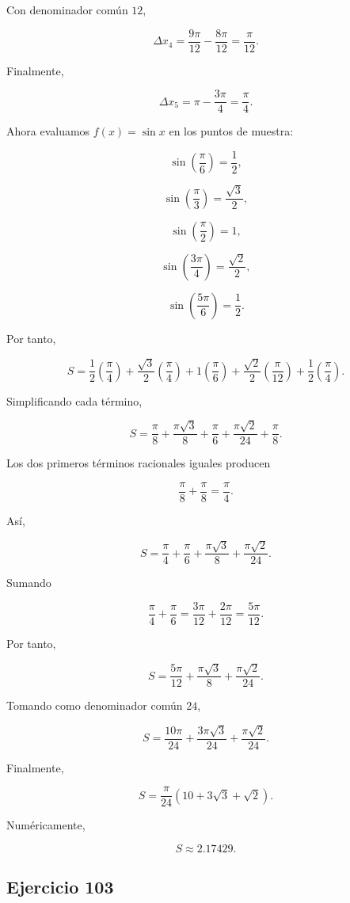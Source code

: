 \documentclass[12pt]{article}
\begin{document}
Con denominador común \(12\),

\[
\Delta x_4
=
\frac{9\pi}{12}-\frac{8\pi}{12}
=
\frac{\pi}{12}.
\]

Finalmente,

\[
\Delta x_5
=
\pi-\frac{3\pi}{4}
=
\frac{\pi}{4}.
\]

Ahora evaluamos \(f(x)=\sin x\) en los puntos de muestra:

\[
\sin\left(\frac{\pi}{6}\right)=\frac12,
\]

\[
\sin\left(\frac{\pi}{3}\right)=\frac{\sqrt3}{2},
\]

\[
\sin\left(\frac{\pi}{2}\right)=1,
\]

\[
\sin\left(\frac{3\pi}{4}\right)=\frac{\sqrt2}{2},
\]

\[
\sin\left(\frac{5\pi}{6}\right)=\frac12.
\]

Por tanto,

\[
S
=
\frac12\left(\frac{\pi}{4}\right)
+
\frac{\sqrt3}{2}
\left(\frac{\pi}{4}\right)
+
1\left(\frac{\pi}{6}\right)
+
\frac{\sqrt2}{2}
\left(\frac{\pi}{12}\right)
+
\frac12\left(\frac{\pi}{4}\right).
\]

Simplificando cada término,

\[
S
=
\frac{\pi}{8}
+
\frac{\pi\sqrt3}{8}
+
\frac{\pi}{6}
+
\frac{\pi\sqrt2}{24}
+
\frac{\pi}{8}.
\]

Los dos primeros términos racionales iguales producen

\[
\frac{\pi}{8}+\frac{\pi}{8}
=
\frac{\pi}{4}.
\]

Así,

\[
S
=
\frac{\pi}{4}
+
\frac{\pi}{6}
+
\frac{\pi\sqrt3}{8}
+
\frac{\pi\sqrt2}{24}.
\]

Sumando

\[
\frac{\pi}{4}+\frac{\pi}{6}
=
\frac{3\pi}{12}+\frac{2\pi}{12}
=
\frac{5\pi}{12}.
\]

Por tanto,

\[
S
=
\frac{5\pi}{12}
+
\frac{\pi\sqrt3}{8}
+
\frac{\pi\sqrt2}{24}.
\]

Tomando como denominador común \(24\),

\[
S
=
\frac{10\pi}{24}
+
\frac{3\pi\sqrt3}{24}
+
\frac{\pi\sqrt2}{24}.
\]

Finalmente,

\[
\boxed{
S
=
\frac{\pi}{24}
\left(
10+3\sqrt3+\sqrt2
\right)
}.
\]

Numéricamente,

\[
\boxed{
S\approx2.17429
}.
\]
\subsection*{Ejercicio 103}
\end{document}

